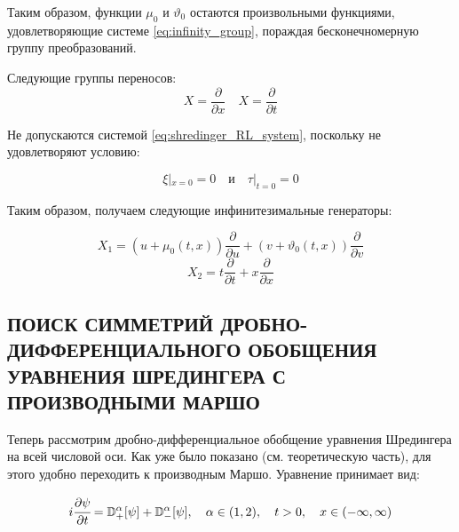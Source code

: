 \documentclass[a4paper, fontsize=14pt]{article}
\newcommand{\MD}[2]{\mathbb{D}_{#1}^{\alpha}[#2]} %
\begin{document}
Таким образом, функции $\mu_0$ и $\vartheta_0$ остаются произвольными функциями, удовлетворяющие системе \eqref{eq:infinity_group},
пораждая бесконечномерную группу преобразований. %

Следующие группы переносов:
\begin{equation*}
  X = \frac{\partial}{\partial x} \quad X = \frac{\partial}{\partial t}
\end{equation*}

Не допускаются системой \eqref{eq:shredinger_RL_system}, поскольку не удовлетворяют условию:

\begin{equation*}
  \xi |_{x = 0} = 0 \quad \text{и} \quad \tau|_{t = 0} = 0
\end{equation*}

Таким образом, получаем следующие инфинитезимальные генераторы:

\begin{equation}
  \label{eq:semi_rotation}
  X_1 = (u + \mu_0(t, x))\frac{\partial}{\partial u} + (v + \vartheta_0(t, x))\frac{\partial}{\partial v}
\end{equation}
\begin{equation}
  X_2 = t \frac{\partial}{\partial t} + x \frac{\partial}{\partial x}
\end{equation}


\subsection[Поиск симметрий дробно-дифференциального обобщения уравнения Шредингера с производными Маршо]{ПОИСК СИММЕТРИЙ ДРОБНО-ДИФФЕРЕНЦИАЛЬНОГО ОБОБЩЕНИЯ УРАВНЕНИЯ ШРЕДИНГЕРА С ПРОИЗВОДНЫМИ МАРШО}

Теперь рассмотрим дробно-дифференциальное обобщение уравнения Шредингера на всей числовой оси.
Как уже было показано (см. теоретическую часть), для этого удобно переходить к производным Маршо.
Уравнение принимает вид:

\begin{equation}
  \label{eq:shredinger_MD_inline}
  i \cfrac{\partial \psi}{\partial t} = \MD{+}{\psi} + \MD{-}{\psi}, \quad \alpha \in (1, 2), \quad t > 0, \quad x \in (-\infty, \infty)
\end{equation}
\end{document}
